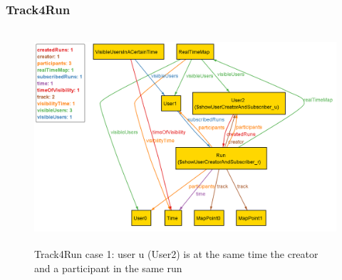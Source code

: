 \newpage
{\color{secblue}\subsubsection{Track4Run}}
\begin{figure}[H]
\includegraphics[width=\linewidth, height=8cm, keepaspectratio]{./Images/Alloy/track4run_v2_1.png}
\centering
\caption{Track4Run case 1: user u (User2) is at the same time the creator and a participant in the same run}
\end{figure}

